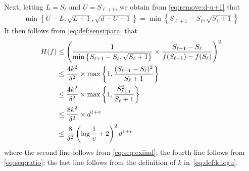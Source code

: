 \documentclass[onecolumn,letterpaper]{IEEEtran}
\newcommand{\cp}{{q}}
\newcommand{\cpn}{{\cp^*}}
\newcommand{\up}{{U}}
\newcommand{\lw}{{L}}
\newcommand{\fgap}{{\delta}}
\newcommand{\fH}{{H(f)}}
\newcommand{\ftau}{{\Gamma}}
\newcommand{\ftaup}{{\hat{\Gamma}}}
\newcommand{\fTn}{\ftau (\cpn)}
\newcommand{\fTpn}{\ftaup (\cpn)}
\newcommand{\cpns}{\cp_0}
\newcommand{\fTpns}{\ftaup (\cpns)}
\newcommand{\seq}{{S}}
\newcommand{\ups}{{\upsilon}}
\newcommand{\logu}{{k}}
\newcommand{\exiind}{{\ell}}
\begin{document}
Next, letting $\lw = \seq_{\exiind}$ and $\up = \seq_{\exiind+1}$, we obtain from \eqref{eq:remove:d-u+1} that 
\begin{align*}
    \min\left\{\up-\lw , \sqrt{\lw+1} , \sqrt{d-\up+1}\right\}=\min\left\{ \seq_{\exiind+1}-\seq_{\exiind} , \sqrt{\seq_{\exiind}+1}\right\}
\end{align*}
It then follows from \eqref{eq:def:sensi:para} that 
\begin{align}
 \label{eq:gamma_seq_3}
    \fH&\leq \left(\frac{1}{\min\left\{\seq_{\exiind+1}-\seq_{\exiind} , \sqrt{\seq_{\exiind}+1 }\right \}}\times \frac{\seq_{\exiind+1}-\seq_{\exiind}}{f(\seq_{\exiind+1})-f(\seq_{\exiind})}\right)^2\notag\\ 
    &\leq \frac{4\logu^2}{\fgap^2} \times \max \left\{ 1 , \frac{(\seq_{\exiind+1}-\seq_{\exiind})^2}{\seq_{\exiind}+1} \right\}  \notag\\ 
    &\leq  \frac{4\logu^2}{\fgap^2} \times \max \left\{ 1 , \frac{\seq_{\exiind+1}^2}{\seq_{\exiind}+1} \right\}  \notag\\
    &\leq  \frac{8\logu^2}{\fgap^2} \times d^{1+\ups} \notag\\ 
    &\leq \frac{8}{\fgap^2}\left( \log \frac{1}{\ups}+2 \right)^2 d^{1+\ups} %
\end{align}
where the second line follows from \eqref{eq:seq:exiind}; the fourth line follows from \eqref{eq:seq:ratio}; the last line follows from the definition of $\logu$ in~\eqref{eq:def:k:logu}.%
\end{document}
